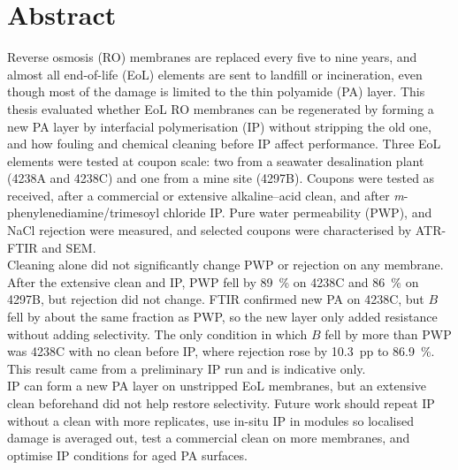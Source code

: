 \chapter*{Abstract}

Reverse osmosis (RO) membranes are replaced every five to nine years, and almost all end-of-life (EoL) elements are sent to landfill or incineration, even though most of the damage is limited to the thin polyamide (PA) layer. This thesis evaluated whether EoL RO membranes can be regenerated by forming a new PA layer by interfacial polymerisation (IP) without stripping the old one, and how fouling and chemical cleaning before IP affect performance. Three EoL elements were tested at coupon scale: two from a seawater desalination plant (4238A and 4238C) and one from a mine site (4297B). Coupons were tested as received, after a commercial or extensive alkaline--acid clean, and after \textit{m}-phenylenediamine/trimesoyl chloride IP. Pure water permeability (PWP), and NaCl rejection were measured, and selected coupons were characterised by ATR-FTIR and SEM.\\

Cleaning alone did not significantly change PWP or rejection on any membrane. After the extensive clean and IP, PWP fell by \qty{89}{\percent} on 4238C and \qty{86}{\percent} on 4297B, but rejection did not change. FTIR confirmed new PA on 4238C, but $B$ fell by about the same fraction as PWP, so the new layer only added resistance without adding selectivity. The only condition in which $B$ fell by more than PWP was 4238C with no clean before IP, where rejection rose by \qty{10.3}{pp} to \qty{86.9}{\percent}. This result came from a preliminary IP run and is indicative only.\\

IP can form a new PA layer on unstripped EoL membranes, but an extensive clean beforehand did not help restore selectivity.  Future work should repeat IP without a clean with more replicates, use in-situ IP in modules so localised damage is averaged out, test a commercial clean on more membranes, and optimise IP conditions for aged PA surfaces.
